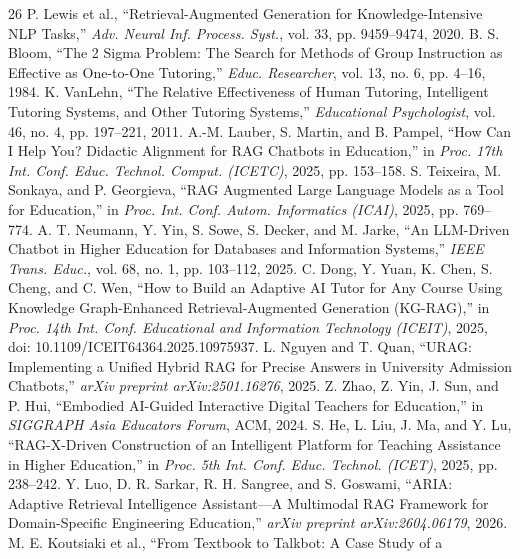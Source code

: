 \documentclass[conference]{IEEEtran}
\begin{document}
\footnotesize
\begin{thebibliography}{26}
P. Lewis et al., ``Retrieval-Augmented Generation for Knowledge-Intensive
NLP Tasks,'' \textit{Adv. Neural Inf. Process. Syst.}, vol. 33,
pp. 9459--9474, 2020.
B. S. Bloom, ``The 2 Sigma Problem: The Search for Methods of Group
Instruction as Effective as One-to-One Tutoring,'' \textit{Educ.
Researcher}, vol. 13, no. 6, pp. 4--16, 1984.
K. VanLehn, ``The Relative Effectiveness of Human Tutoring, Intelligent
Tutoring Systems, and Other Tutoring Systems,'' \textit{Educational
Psychologist}, vol. 46, no. 4, pp. 197--221, 2011.
A.-M. Lauber, S. Martin, and B. Pampel, ``How Can I Help You? Didactic
Alignment for RAG Chatbots in Education,'' in \textit{Proc. 17th Int.
Conf. Educ. Technol. Comput. (ICETC)}, 2025, pp. 153--158.
S. Teixeira, M. Sonkaya, and P. Georgieva, ``RAG Augmented Large
Language Models as a Tool for Education,'' in \textit{Proc. Int. Conf.
Autom. Informatics (ICAI)}, 2025, pp. 769--774.
A. T. Neumann, Y. Yin, S. Sowe, S. Decker, and M. Jarke,
``An LLM-Driven Chatbot in Higher Education for Databases and
Information Systems,'' \textit{IEEE Trans. Educ.}, vol. 68, no. 1,
pp. 103--112, 2025.
C. Dong, Y. Yuan, K. Chen, S. Cheng, and C. Wen, ``How to Build an
Adaptive AI Tutor for Any Course Using Knowledge Graph-Enhanced
Retrieval-Augmented Generation (KG-RAG),''
in \textit{Proc. 14th Int. Conf. Educational and Information Technology
(ICEIT)}, 2025, doi: 10.1109/ICEIT64364.2025.10975937.
L. Nguyen and T. Quan, ``URAG: Implementing a Unified Hybrid RAG for
Precise Answers in University Admission Chatbots,''
\textit{arXiv preprint arXiv:2501.16276}, 2025.
Z. Zhao, Z. Yin, J. Sun, and P. Hui, ``Embodied AI-Guided Interactive
Digital Teachers for Education,'' in \textit{SIGGRAPH Asia Educators
Forum}, ACM, 2024.
S. He, L. Liu, J. Ma, and Y. Lu, ``RAG-X-Driven Construction of an
Intelligent Platform for Teaching Assistance in Higher Education,''
in \textit{Proc. 5th Int. Conf. Educ. Technol. (ICET)}, 2025,
pp. 238--242.
Y. Luo, D. R. Sarkar, R. H. Sangree, and S. Goswami,
``ARIA: Adaptive Retrieval Intelligence Assistant---A Multimodal RAG
Framework for Domain-Specific Engineering Education,''
\textit{arXiv preprint arXiv:2604.06179}, 2026.
M. E. Koutsiaki et al., ``From Textbook to Talkbot: A Case Study of a

\end{thebibliography}
\end{document}
